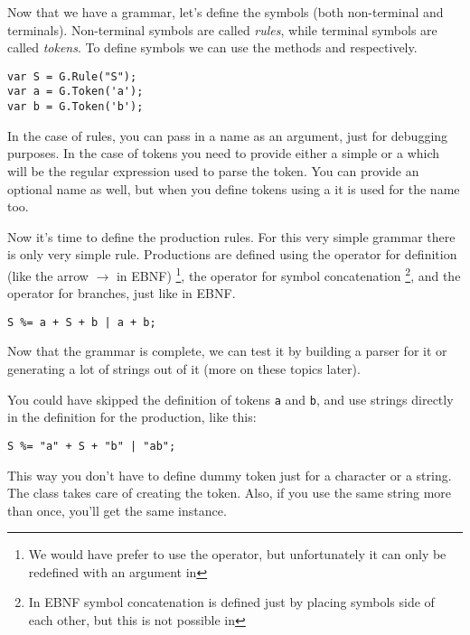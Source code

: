 Now that we have a grammar, let's define the symbols (both non-terminal and terminals).
Non-terminal symbols are called \emph{rules}, while terminal symbols are called \emph{tokens}.
To define symbols we can use the methods 
and  respectively.

\begin{verbatim}
var S = G.Rule("S");
var a = G.Token('a');
var b = G.Token('b');
\end{verbatim}

In the case of rules, you can pass in a name as an argument, just for debugging
purposes. In the case of tokens you need to provide either a simple 
or a  which will be the regular expression used to parse
the token. You can provide an optional name as well, but when you define
tokens using a  it is used for the name too.

Now it's time to define the production rules. For this very simple grammar there
is only very simple rule.
Productions are defined using the \code{\%=} operator
for definition (like the arrow $\rightarrow$ in EBNF)
\footnote{We would have prefer to use the \code{>>} operator, but unfortunately 
it can only be redefined with an  argument in \cs}, the \code{+} operator
for symbol concatenation
\footnote{In EBNF symbol concatenation is defined just by placing symbols
side of each other, but this is not possible in \cs}, 
and the \code{|} operator for branches, just like in EBNF.

\begin{verbatim}
S %= a + S + b | a + b;
\end{verbatim}

Now that the grammar is complete, we can test it by building a parser for it
or generating a lot of strings out of it (more on these topics later).

You could have skipped the definition of tokens \verb|a| and \verb|b|,
and use strings directly in the definition for the production, like this:

\begin{verbatim}
S %= "a" + S + "b" | "ab";
\end{verbatim}

This way you don't have to define dummy token just for a character or
a string. The  class
takes care of creating the token. Also, if you use the same string more than once,
you'll get the same  instance.